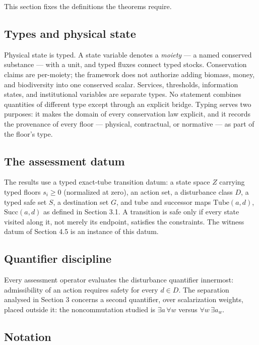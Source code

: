 \documentclass[review,11pt]{elsarticle}
\begin{document}
This section fixes the definitions the theorems require.

\subsection{Types and physical
state}\label{types-and-physical-state}

Physical state is typed. A state variable denotes a \emph{moiety} --- a
named conserved substance --- with a unit, and typed fluxes connect
typed stocks. Conservation claims are per-moiety; the framework does not
authorize adding biomass, money, and biodiversity into one conserved
scalar. Services, thresholds, information states, and institutional
variables are separate types. No statement combines quantities of different type except through an explicit bridge. Typing serves two purposes: it makes the domain of every
conservation law explicit, and it records the provenance of every floor
--- physical, contractual, or normative --- as part of the floor's type.

\subsection{The assessment datum}\label{the-assessment-datum}

The results use a typed exact-tube transition datum: a state space \(Z\) carrying typed floors \(s_i \ge 0\) (normalized at zero), an action set, a disturbance class \(D\), a typed safe set \(S\), a destination set \(G\), and tube and successor maps \(\mathrm{Tube}(a,d)\), \(\mathrm{Succ}(a,d)\) as defined in Section 3.1. A transition is safe only if every state visited along it, not merely its endpoint, satisfies the constraints. The witness datum of Section 4.5 is an instance of this datum.

\subsection{Quantifier discipline}\label{quantifier-discipline}

Every assessment operator evaluates the disturbance quantifier innermost: admissibility of an action requires safety for every \(d \in D\). The separation analysed in Section 3 concerns a second quantifier, over scalarization weights, placed outside it: the noncommutation studied is \(\exists a\, \forall w\) versus \(\forall w\, \exists a_w\).

\subsection{Notation}\label{notation}
\end{document}
